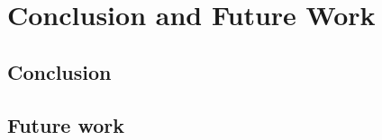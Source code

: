 \chapter{Conclusion and Future Work}
\label{chapter_conclusion}

\section{Conclusion}



\section{Future work}

